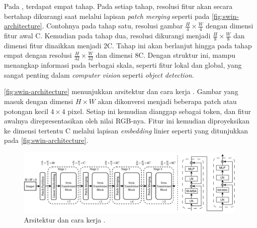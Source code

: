 Pada \swin, terdapat empat tahap. Pada setiap tahap, resolusi fitur akan secara bertahap dikurangi saat melalui lapisan \emph{patch merging} seperti pada \autoref{fig:swin-architecture}. Contohnya pada tahap satu, resolusi gambar $\frac{H}{4} \times \frac{W}{4}$ dengan dimensi fitur awal C. Kemudian pada tahap dua, resolusi dikurangi menjadi $\frac{H}{8} \times \frac{W}{8}$ dan 
dimensi fitur dinaikkan menjadi 2C. Tahap ini akan berlanjut hingga pada tahap empat dengan resolusi $\frac{H}{32} \times \frac{W}{32}$ dan dimensi 8C. Dengan struktur ini, \swin{} mampu menangkap informasi pada berbagai skala, seperti fitur lokal 
dan global, yang sangat penting dalam \emph{computer vision} seperti \emph{object detection}. 

\autoref{fig:swin-architecture} menunjukkan arsitektur dan cara kerja \swin. Gambar yang masuk dengan dimensi $H \times W$ akan dikonversi menjadi beberapa patch atau potongan kecil $4 \times 4$ pixel. Setiap \patch{} ini kemudian dianggap sebagai token, dan fitur awalnya direpresentasikan oleh nilai RGB-nya. Fitur ini kemudian 
diproyeksikan ke dimensi tertentu C melalui lapisan \emph{embedding} linier seperti yang ditunjukkan pada \autoref{fig:swin-architecture}.

\begin{figure}[htbp]
    \centering
    \includegraphics[width=1\textwidth]{images/swin-architecture.png}
    \caption{Arsitektur dan cara kerja \swin{} \parencite{liu2021swin}.}
    \label{fig:swin-architecture}
\end{figure}